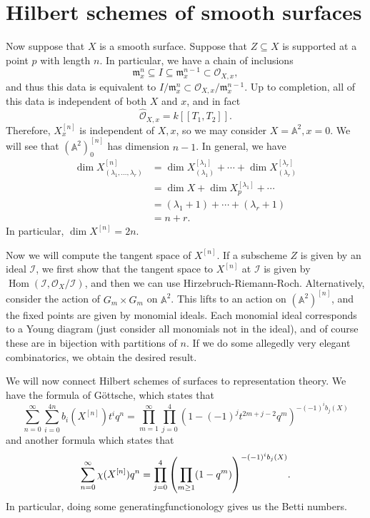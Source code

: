 \documentclass[leqno, openany]{memoir}
\theoremstyle{definition}
\theoremstyle{remark}
\theoremstyle{plain}
\theoremstyle{definition}
\theoremstyle{remark}
\newcommand{\A}{\mathbb{A}}
\newcommand{\mc}[1]{\mathcal{#1}}
\newcommand{\mf}[1]{\mathfrak{#1}}
\newcommand{\wh}[1]{\widehat{#1}}
\newcommand{\1}{\mathbf{1}}
\newcommand{\2}{\mathbf{2}}
\newcommand{\3}{\mathbf{3}}
\DeclareMathOperator{\Hom}{Hom}
\begin{document}
\section{Hilbert schemes of smooth surfaces}%
\label{sec:hilbert_schemes_of_smooth_surfaces}

Now suppose that $X$ is a smooth surface. Suppose that $Z \subseteq X$ is supported at a point $p$ with length $n$. In particular, we have a chain of inclusions
\[ \mf{m}_x^n \subseteq I \subseteq \mf{m}_x^{n-1} \subset \mc{O}_{X,x}, \]
and thus this data is equivalent to $I / \mf{m}_x^n \subset \mc{O}_{X,x} / \mf{m}_x^{n-1}$. Up to completion, all of this data is independent of both $X$ and $x$, and in fact
\[ \wh{\mc{O}}_{X,x} = k[[T_1, T_2]]. \]
Therefore, $X_x^{[n]}$ is independent of $X,x$, so we may consider $X = \A^2, x = 0$. We will see that ${(\A^2)}_0^{[n]}$ has dimension $n-1$. In general, we have
\begin{align*} 
    \dim X_{(\lambda_1, \ldots, \lambda_r)}^{[n]} &= \dim X_{(\lambda_1)}^{[\lambda_1]} + \cdots + \dim X_{(\lambda_r)}^{[\lambda_r]} \\
    &= \dim X + \dim X_p^{[\lambda_1]} + \cdots \\
    &= (\lambda_1 + 1) + \cdots + (\lambda_r + 1) \\
    &= n + r.
\end{align*}
In particular, $\dim X^{[n]} = 2n$.

Now we will compute the tangent space of $X^{[n]}$. If a subscheme $Z$ is given by an ideal $\mc{I}$, we first show that the tangent space to $X^{[n]}$ at $\mc{I}$ is given by $\Hom(\mc{I}, \mc{O}_X/\mc{I})$, and then we can use Hirzebruch-Riemann-Roch. Alternatively, consider the action of $G_m \times G_m$ on $\A^2$. This lifts to an action on ${(\A^2)}^{[n]}$, and the fixed points are given by monomial ideals. Each monomial ideal corresponds to a Young diagram (just consider all monomials not in the ideal), and of course these are in bijection with partitions of $n$. If we do some allegedly very elegant combinatorics, we obtain the desired result.

We will now connect Hilbert schemes of surfaces to representation theory. We have the formula of G\"ottsche, which states that
\[ \sum_{n = 0}^{\infty} \sum_{i=0}^{4n} b_i(X^{[n]}) t^i q^n = \prod_{m=1}^{\infty} \prod_{j=0}^4 {(1- {(-1)}^j t^{2m+j-2} q^m)}^{-{(-1)}^i b_j(X)} \]
and another formula which states that
\[ \sum_{n=0}^{\infty} \chi(X^{[n]}) q^n = \prod_{j=0}^4 {\qty(\prod_{m \geq 1} (1-q^m))}^{-{(-1)}^i b_j(X)}. \]
In particular, doing some generatingfunctionology gives us the Betti numbers.
\end{document}
